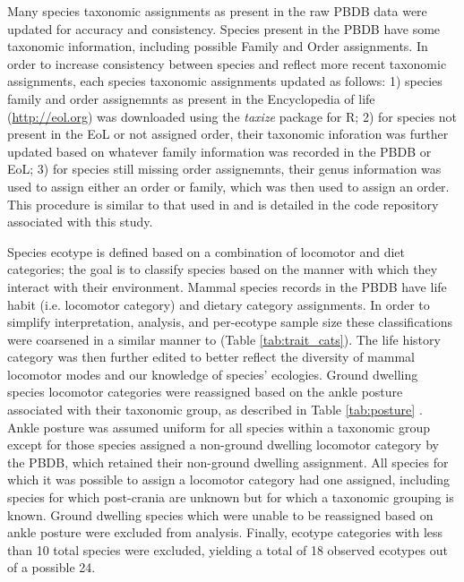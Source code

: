 \documentclass[12pt,letterpaper]{article}
\begin{document}
Many species taxonomic assignments as present in the raw PBDB data were updated for accuracy and consistency. Species present in the PBDB have some taxonomic information, including possible Family and Order assignments. In order to increase consistency between species and reflect more recent taxonomic assignments, each species taxonomic assignments updated as follows: 1) species family and order assignemnts as present in the Encyclopedia of life (\url{http://eol.org}) was downloaded using the \textit{taxize} package for R; 2) for species not present in the EoL or not assigned order, their taxonomic inforation was further updated based on whatever family information was recorded in the PBDB or EoL; 3) for species still missing order assignemnts, their genus information was used to assign either an order or family, which was then used to assign an order. This procedure is similar to that used in \citet{Smits2015b} and is detailed in the code repository associated with this study.
%  


Species ecotype is defined based on a combination of locomotor and diet categories; the goal is to classify species based on the manner with which they interact with their environment. Mammal species records in the PBDB have life habit (i.e. locomotor category) and dietary category assignments. In order to simplify interpretation, analysis, and per-ecotype sample size these classifications were coarsened in a similar manner to \citet{Smits2015b} (Table \ref{tab:trait_cats}). The life history category was then further edited to better reflect the diversity of mammal locomotor modes and our knowledge of species' ecologies. Ground dwelling species locomotor categories were reassigned based on the ankle posture associated with their taxonomic group, as described in Table \ref{tab:posture} \citep{Carrano1999}. Ankle posture was assumed uniform for all species within a taxonomic group except for those species assigned a non-ground dwelling locomotor category by the PBDB, which retained their non-ground dwelling assignment. All species for which it was possible to assign a locomotor category had one assigned, including species for which post-crania are unknown but for which a taxonomic grouping is known. Ground dwelling species which were unable to be reassigned based on ankle posture were excluded from analysis. Finally, ecotype categories with less than 10 total species were excluded, yielding a total of 18 observed ecotypes out of a possible 24.
\end{document}
